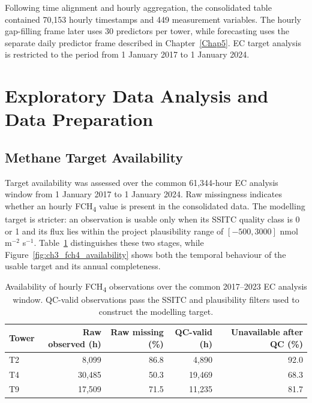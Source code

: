 
Following time alignment and hourly aggregation, the consolidated table
contained 70,153 hourly timestamps and 449 measurement variables. The hourly
gap-filling frame later uses 30 predictors per tower, while forecasting uses
the separate daily predictor frame described in Chapter~\ref{Chap5}. EC target
analysis is restricted to the period from 1 January 2017 to 1 January 2024.

\section{Exploratory Data Analysis and Data Preparation}
\subsection{Methane Target Availability}

Target availability was assessed over the common 61,344-hour EC analysis window from 1 January
2017 to 1 January 2024. Raw missingness indicates whether an hourly FCH\textsubscript{4} value is
present in the consolidated data. The modelling target is stricter: an observation is usable only
when its SSITC quality class is 0 or 1 and its flux lies within the project plausibility range of
$[-500,3000]$ nmol m$^{-2}$ s$^{-1}$. Table~\ref{tab:ch3_fch4_missingness} distinguishes these two
stages, while Figure~\ref{fig:ch3_fch4_availability} shows both the temporal behaviour of the usable
target and its annual completeness.

\begin{table}[htbp]
\centering
\small
\caption{Availability of hourly FCH\textsubscript{4} observations over the common 2017--2023 EC
analysis window. QC-valid observations pass the SSITC and plausibility filters used to construct the
modelling target.}
\label{tab:ch3_fch4_missingness}
\begin{tabular*}{\textwidth}{@{\extracolsep{\fill}}lrrrr@{}}
\toprule
Tower & Raw observed (h) & Raw missing (\%) & QC-valid (h) & Unavailable after QC (\%) \\
\midrule
T2 & 8,099 & 86.8 & 4,890 & 92.0 \\
T4 & 30,485 & 50.3 & 19,469 & 68.3 \\
T9 & 17,509 & 71.5 & 11,235 & 81.7 \\
\bottomrule
\end{tabular*}
\end{table}

